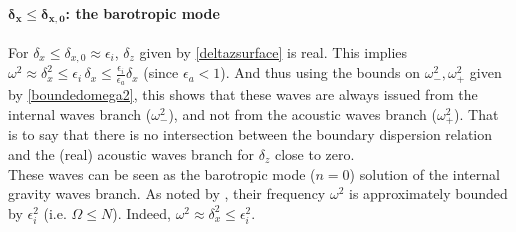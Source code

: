 \paragraph{$\boldsymbol{\delta_x \le \delta_{x,0}}$: the barotropic mode}
For $\delta_x \le \delta_{x,0} \approx \epsilon_i$, $\delta_z$ given by \ref{deltazsurface} is real. This implies $\omega^2 \approx \delta_x^2 \le \epsilon_i\, \delta_x \le \frac{\epsilon_i}{\epsilon_a}\delta_x$ (since $\epsilon_a < 1$). And thus using the bounds on $\omega_-^2, \omega_+^2$ given by \ref{boundedomega2}, this shows that these waves are always issued from the internal waves branch ($\omega_-^2$), and not from the acoustic waves branch ($\omega_+^2$). That is to say that there is no intersection between the boundary dispersion relation and the (real) acoustic waves branch for $\delta_z$ close to zero.\\
These waves can be seen as the barotropic mode ($n=0$) solution of the internal gravity waves branch. As noted by \cite{dukowicz_2013}, their frequency $\omega^2$ is approximately bounded by $\epsilon_i^2$ (i.e. $\Omega \le N$). Indeed, $\omega^2 \approx \delta_x^2 \le \epsilon_i^2$.
%
